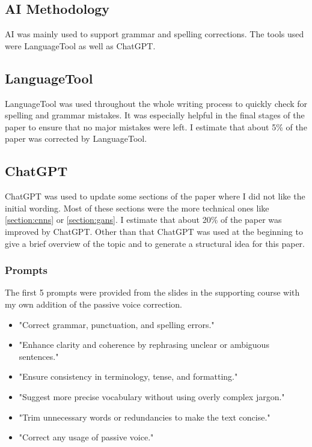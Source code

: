 \begin{appendices}


\section{AI Methodology}

AI was mainly used to support grammar and spelling corrections. The tools used were LanguageTool as well as ChatGPT.

\subsection{LanguageTool} %
LanguageTool was used throughout the whole writing process to quickly check for spelling and grammar mistakes. It was especially helpful in the final stages of the paper to ensure that no major mistakes were left. I estimate that about 5\% of the paper was corrected by LanguageTool.

\subsection{ChatGPT}
ChatGPT was used to update some sections of the paper where I did not like the initial wording. Most of these sections were the more technical ones like \ref{section:cnns} or \ref{section:gans}.
I estimate that about 20\% of the paper was improved by ChatGPT.
Other than that ChatGPT was used at the beginning to give a brief overview of the topic and to generate a structural idea for this paper.

\subsubsection{Prompts}
The first 5 prompts were provided from the slides in the supporting course with my own addition of the passive voice correction.
\begin{itemize}
    \item "Correct grammar, punctuation, and spelling errors."
    \item "Enhance clarity and coherence by rephrasing unclear or ambiguous sentences."
    \item "Ensure consistency in terminology, tense, and formatting."
    \item "Suggest more precise vocabulary without using overly complex jargon."
    \item "Trim unnecessary words or redundancies to make the text concise."
    \item "Correct any usage of passive voice."
\end{itemize}


\end{appendices}
